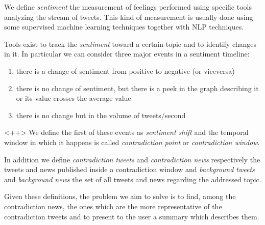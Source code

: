 We define \emph{sentiment} the measurement of feelings performed using specific
tools analyzing the stream of tweets. This kind of measurement is usually done
using some supervised machine learning techniques together with NLP techniques.

Tools exist to track the \emph{sentiment} toward a certain topic and to identify
changes in it. In particular we can consider three major events in a sentiment
timeline:
\begin{enumerate}
	\item there is a change of sentiment from positive to negative (or
		viceversa)
	\item there is no change of sentiment, but there is a peek in the graph
		describing it or its value crosses the average value
	\item there is no change but in the volume of tweets/second
\end{enumerate}<++>
We define the first of these events as \emph{sentiment shift} and the temporal
window in which it happens is called \emph{contradiction point} or
\emph{contradiction window}.

In addition we define \emph{contradiction tweets} and \emph{contradiction news}
respectively the tweets and news published inside a contradiction window and
\emph{background tweets} and \emph{background news} the set of all tweets and
news regarding the addressed topic.

Given these definitions, the problem we aim to solve is to find, among the
contradiction news, the ones which are the more representative of the
contradiction tweets and to present to the user a summary which describes them.
